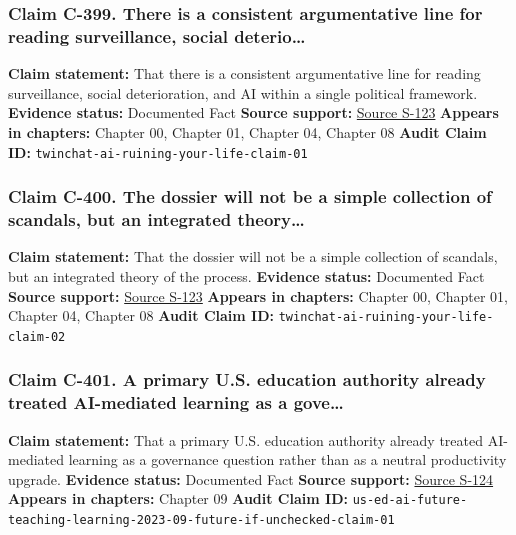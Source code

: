\documentclass[
  american,
  11pt,
  letterpaper,
]{article}
\begin{document}
\subsubsection{Claim C-399. There is a consistent argumentative line for
reading surveillance, social
deterio\ldots{}}\label{claim-c-399-there-is-a-consistent-argumentative-line-for-reading-surveillance-social-deterio}

\textbf{Claim statement:} That there is a consistent argumentative line
for reading surveillance, social deterioration, and AI within a single
political framework. \textbf{Evidence status:} Documented Fact
\textbf{Source support:}
\hyperref[source-s-123-how-ai-is-ruining-your-life-to-build-an-empire]{Source
S-123} \textbf{Appears in chapters:} Chapter 00, Chapter 01, Chapter 04,
Chapter 08 \textbf{Audit Claim ID:}
\texttt{twinchat-ai-ruining-your-life-claim-01}

\subsubsection{Claim C-400. The dossier will not be a simple collection
of scandals, but an integrated
theory\ldots{}}\label{claim-c-400-the-dossier-will-not-be-a-simple-collection-of-scandals-but-an-integrated-theory}

\textbf{Claim statement:} That the dossier will not be a simple
collection of scandals, but an integrated theory of the process.
\textbf{Evidence status:} Documented Fact \textbf{Source support:}
\hyperref[source-s-123-how-ai-is-ruining-your-life-to-build-an-empire]{Source
S-123} \textbf{Appears in chapters:} Chapter 00, Chapter 01, Chapter 04,
Chapter 08 \textbf{Audit Claim ID:}
\texttt{twinchat-ai-ruining-your-life-claim-02}

\subsubsection{Claim C-401. A primary U.S. education authority already
treated AI-mediated learning as a
gove\ldots{}}\label{claim-c-401-a-primary-u-s-education-authority-already-treated-ai-mediated-learning-as-a-gove}

\textbf{Claim statement:} That a primary U.S. education authority
already treated AI-mediated learning as a governance question rather
than as a neutral productivity upgrade. \textbf{Evidence status:}
Documented Fact \textbf{Source support:}
\hyperref[source-s-124-artificial-intelligence-and-the-future-of-teaching-and-learning-insights-and-recommendations]{Source
S-124} \textbf{Appears in chapters:} Chapter 09 \textbf{Audit Claim ID:}
\texttt{us-ed-ai-future-teaching-learning-2023-09-future-if-unchecked-claim-01}
\end{document}
